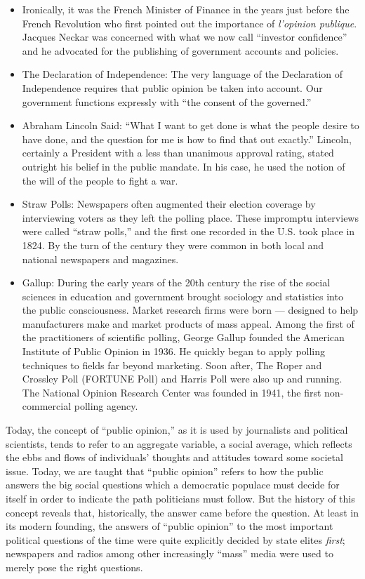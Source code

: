 \documentclass[12pt,book]{article}
\begin{document}
\begin{itemize}
\item
  Ironically, it was the French Minister of Finance in the years just
  before the French Revolution who first pointed out the importance of
  \emph{l'opinion publique}. Jacques Neckar was concerned with what we
  now call ``investor confidence'' and he advocated for the publishing
  of government accounts and policies.
\item
  The Declaration of Independence: The very language of the Declaration
  of Independence requires that public opinion be taken into account.
  Our government functions expressly with ``the consent of the
  governed.''
\item
  Abraham Lincoln Said: ``What I want to get done is what the people
  desire to have done, and the question for me is how to find that out
  exactly.'' Lincoln, certainly a President with a less than unanimous
  approval rating, stated outright his belief in the public mandate. In
  his case, he used the notion of the will of the people to fight a war.
\item
  Straw Polls: Newspapers often augmented their election coverage by
  interviewing voters as they left the polling place. These impromptu
  interviews were called ``straw polls,'' and the first one recorded in
  the U.S. took place in 1824. By the turn of the century they were
  common in both local and national newspapers and magazines.
\item
  Gallup: During the early years of the 20th century the rise of the
  social sciences in education and government brought sociology and
  statistics into the public consciousness. Market research firms were
  born --- designed to help manufacturers make and market products of
  mass appeal. Among the first of the practitioners of scientific
  polling, George Gallup founded the American Institute of Public
  Opinion in 1936. He quickly began to apply polling techniques to
  fields far beyond marketing. Soon after, The Roper and Crossley Poll
  (FORTUNE Poll) and Harris Poll were also up and running. The National
  Opinion Research Center was founded in 1941, the first non-commercial
  polling agency.
\end{itemize}

Today, the concept of ``public opinion,'' as it is used by journalists
and political scientists, tends to refer to an aggregate variable, a
social average, which reflects the ebbs and flows of individuals'
thoughts and attitudes toward some societal issue. Today, we are taught
that ``public opinion'' refers to how the public answers the big social
questions which a democratic populace must decide for itself in order to
indicate the path politicians must follow. But the history of this
concept reveals that, historically, the answer came before the question.
At least in its modern founding, the answers of ``public opinion'' to
the most important political questions of the time were quite explicitly
decided by state elites \emph{first}; newspapers and radios among other
increasingly ``mass'' media were used to merely pose the right
questions.
\end{document}
